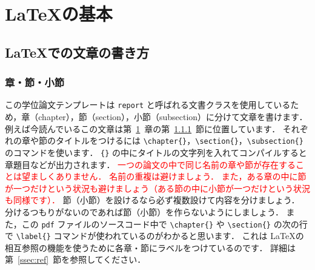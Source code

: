 \chapter{\LaTeX の基本}
\label{ch:basic}


\section{\LaTeX での文章の書き方}
\label{sec:sentence_in_LaTeX}

\subsection{章・節・小節}
\label{ssec:ch_sec_ssec}

この学位論文テンプレートは \verb|report| と呼ばれる文書クラスを使用しているため，章（chapter），節（section），小節（subsection）に分けて文章を書けます．
例えば今読んでいるこの文章は第~\ref{ch:basic}~章の第~\ref{ssec:ch_sec_ssec}~節に位置しています．
それぞれの章や節のタイトルをつけるには \verb|\chapter{}|，\verb|\section{}|，\verb|\subsection{}| のコマンドを使います．
\verb|{}| の中にタイトルの文字列を入れてコンパイルすると章題目などが出力されます．
\textcolor{red}{一つの論文の中で同じ名前の章や節が存在することは望ましくありません．
名前の重複は避けましょう．
また，ある章の中に節が一つだけという状況も避けましょう（ある節の中に小節が一つだけという状況も同様です）．}
節（小節）を設けるなら必ず複数設けて内容を分けましょう．
分けるつもりがないのであれば節（小節）を作らないようにしましょう．
また，この \verb|pdf| ファイルのソースコード中で \verb|\chapter{}| や \verb|\section{}| の次の行で \verb|\label{}| コマンドが使われているのがわかると思います．
これは \LaTeX の相互参照の機能を使うために各章・節にラベルをつけているのです．
詳細は第~\ref{ssec:ref}~節を参照してください．

